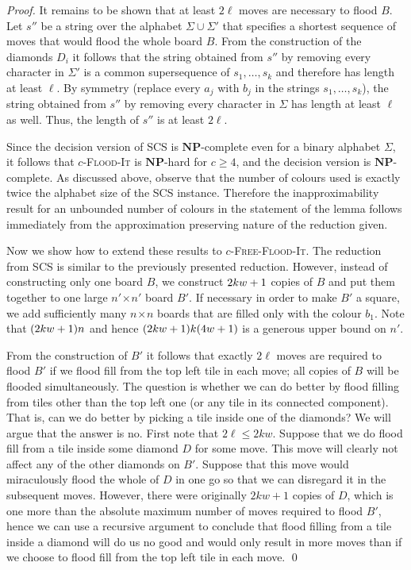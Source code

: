\documentclass[a4paper,11pt]{llncs}
\newcounter{l}
\renewcommand{\geq}{\geqslant}
\renewcommand{\leq}{\leqslant}
\newcommand{\NPtime}{\ensuremath{\mathbf{NP}}}
\newcommand{\Coloroid}[1]{$#1$-\textsc{Flood-It}}
\newcommand{\ColoroidFree}[1]{$#1$-\textsc{Free-Flood-It}}
\newcommand{\SCS}{\textsc{SCS}}
\newcommand{\recdim}[2]{$#1$$\mspace{1mu}$$\times$$\mspace{1mu}$$#2$}
\begin{document}
\begin{proof}
    It remains to be shown that at least $2\ell$ moves are necessary to flood $B$. Let $s''$ be a string over the alphabet $\Sigma\cup \Sigma'$ that specifies a shortest sequence of moves that would flood the whole board $B$. From the construction of the diamonds $D_i$ it follows that the string obtained from $s''$ by removing every character in $\Sigma'$ is a common supersequence of $s_1,\dots,s_k$ and therefore has length at least $\ell$. By symmetry (replace every $a_j$ with $b_j$ in the strings $s_1,\dots,s_k$), the string obtained from $s''$ by removing every character in $\Sigma$ has length at least $\ell$ as well. Thus, the length of $s''$ is at least $2\ell$.

    Since the decision version of \SCS{} is \NPtime-complete even for a binary alphabet $\Sigma$, it follows that \Coloroid{c} is \NPtime-hard for $c\geq 4$, and the decision version is \NPtime-complete.  As discussed above, observe that the number of colours used is exactly twice the alphabet size of the \SCS{} instance. Therefore the inapproximability result for an unbounded number of colours in the statement of the lemma follows immediately from the approximation preserving nature of the reduction given.

    Now we show how to extend these results to \ColoroidFree{c}. The reduction from \SCS{} is similar to the previously presented reduction. However, instead of constructing only one board $B$, we construct $2kw+1$ copies of $B$ and put them together to one large \recdim{n'}{n'} board $B'$. If necessary in order to make $B'$ a square, we add sufficiently many \recdim{n}{n} boards that are filled only with the colour $b_1$. Note that $(2kw+1)n$ and hence $(2kw+1)k(4w+1)$ is a generous upper bound on $n'$.

    From the construction of $B'$ it follows that exactly $2\ell$ moves are required to flood $B'$ if we flood fill from the top left tile in each move; all copies of $B$ will be flooded simultaneously. The question is whether we can do better by flood filling from tiles other than the top left one (or any tile in its connected component). That is, can we do better by picking a tile inside one of the diamonds? We will argue that the answer is no. First note that $2\ell\leq 2kw$. Suppose that we do flood fill from a tile inside some diamond $D$ for some move. This move will clearly not affect any of the other diamonds on $B'$. Suppose that this move would miraculously flood the whole of $D$ in one go so that we can disregard it in the subsequent moves. However, there were originally $2kw+1$ copies of $D$, which is one more than the absolute maximum number of moves required to flood $B'$, hence we can use a recursive argument to conclude that flood filling from a tile inside a diamond will do us no good and would only result in more moves than if we choose to flood fill from the top left tile in each move.
    \qed
\end{proof}
\end{document}
